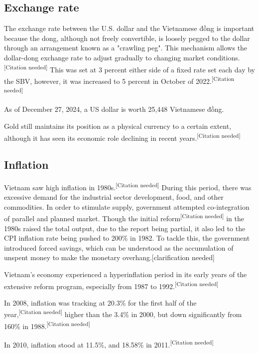 \documentclass{article}
\begin{document}
\subsection*{Exchange rate}
The exchange rate between the U.S. dollar and the Vietnamese đồng is important because the dong, although not freely convertible, is loosely pegged to the dollar through an arrangement known as a "crawling peg". This mechanism allows the dollar-dong exchange rate to adjust gradually to changing market conditions.\textsuperscript{[Citation needed]} This was set at 3 percent either side of a fixed rate set each day by the SBV, however, it was increased to 5 percent in October of 2022.\textsuperscript{[Citation needed]}

As of December 27, 2024, a US dollar is worth 25,448 Vietnamese đồng.

Gold still maintains its position as a physical currency to a certain extent, although it has seen its economic role declining in recent years.\textsuperscript{[Citation needed]}

\subsection*{Inflation}

Vietnam saw high inflation in 1980s.\textsuperscript{[Citation needed]} During this period, there was excessive demand for the industrial sector development, food, and other commodities. In order to stimulate supply, government attempted co-integration of parallel and planned market. Though the initial reform\textsuperscript{[Citation needed]} in the 1980s raised the total output, due to the report being partial, it also led to the CPI inflation rate being pushed to 200\% in 1982. To tackle this, the government introduced forced savings, which can be understood as the accumulation of unspent money to make the monetary overhang.[clarification needed]

Vietnam's economy experienced a hyperinflation period in its early years of the extensive reform program, especially from 1987 to 1992.\textsuperscript{[Citation needed]}

In 2008, inflation was tracking at 20.3\% for the first half of the \\year,\textsuperscript{[Citation needed]} higher than the 3.4\% in 2000, but down significantly from 160\% in 1988.\textsuperscript{[Citation needed]}

In 2010, inflation stood at 11.5\%, and 18.58\% in 2011.\textsuperscript{[Citation needed]}
\end{document}
